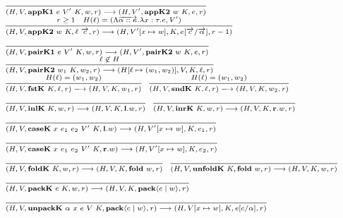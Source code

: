 \documentclass[fleqn]{article}
\begin{document}
\[
\scriptsize
\begin{array}{l}	
\infer{(H,V,\mathbf{appK1}~e~V'~K,w,r) \longrightarrow (H,V',\mathbf{appK2}~w~K,e,r)}{\vspace{1em}} \\
\infer{(H,V,\mathbf{appK2}~w~K,\ell~\overrightarrow{c},r) \longrightarrow (H,V'[x \mapsto w],K,e[\overrightarrow{c}/\overrightarrow{\alpha}],r-1)}{r \ge 1 & H(\ell) = (\Lambda \overrightarrow{\alpha::\kappa}. \lambda x:\tau.e,V')} \\
\infer{(H,V,\mathbf{pairK1}~e~V'~K,w,r) \longrightarrow (H,V',\mathbf{pairK2}~w~K,e,r)}{\vspace{1em}} \\
\infer{(H,V,\mathbf{pairK2}~w_1~K,w_2,r) \longrightarrow (H[\ell \mapsto (w_1,w_2)],V,K,\ell,r)}{\ell \not\in H} \\
\infer{(H,V,\mathbf{fstK}~K,\ell,r) \longrightarrow (H,V,K,w_1,r)}{H(\ell) = (w_1,w_2)} \hspace{1em}
\infer{(H,V,\mathbf{sndK}~K,\ell,r) \longrightarrow (H,V,K,w_2,r)}{H(\ell) = (w_1,w_2)} \\
\infer{(H,V,\mathbf{inlK}~K,w,r) \longrightarrow (H,V,K,\mathbf{l}.w,r)}{\vspace{1em}} \hspace{1em}
\infer{(H,V,\mathbf{inrK}~K,w,r) \longrightarrow (H,V,K,\mathbf{r}.w,r)}{\vspace{1em}} \\
\infer{(H,V,\mathbf{caseK}~x~e_1~e_2~V'~K, \mathbf{l}.w) \longrightarrow (H,V'[x\mapsto w],K,e_1,r)}{\vspace{1em}} \\
\infer{(H,V,\mathbf{caseK}~x~e_1~e_2~V'~K, \mathbf{r}.w) \longrightarrow (H,V'[x\mapsto w],K,e_2,r)}{\vspace{1em}} \\
\infer{(H,V,\mathbf{foldK}~K,w,r) \longrightarrow (H,V,K,\mathbf{fold}~w,r)}{\vspace{1em}} \hspace{1em}
\infer{(H,V,\mathbf{unfoldK}~K,\mathbf{fold}~w,r) \longrightarrow (H,V,K,w,r)}{\vspace{1em}} \\
\infer{(H,V,\mathbf{packK}~c~K,w,r) \longrightarrow (H,V,K,\mathbf{pack} \langle c \mid w \rangle,r)}{\vspace{1em}} \\
\infer{(H,V,\mathbf{unpackK}~\alpha~x~e~V~K,\mathbf{pack} \langle c \mid w \rangle,r) \longrightarrow (H,V[x \mapsto w],K,e[c/\alpha],r)}{\vspace{1em}} \\

\end{array}\]
\end{document}
